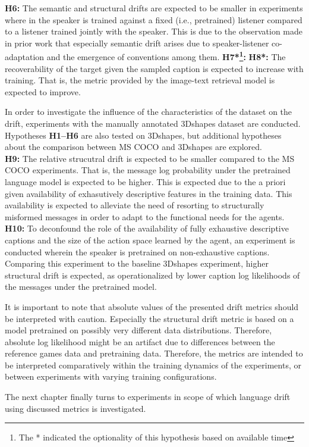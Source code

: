 \textbf{H6:}  The semantic and structural drifts are expected to be smaller in experiments where in the speaker is trained against a fixed (i.e., pretrained) listener compared to a listener trained jointly with the speaker. This is due to the observation made in prior work that especially semantic drift arises due to speaker-listener co-adaptation and the emergence of conventions among them. \newline
\textbf{H7*\footnote{The * indicated the optionality of this hypothesis based on available time}:}  \newline
\textbf{H8*:} The recoverability of the target given the sampled caption is expected to increase with training. That is, the metric provided by the image-text retrieval model is expected to improve.  \newline

In order to investigate the influence of the characteristics of the dataset on the drift, experiments with the manually annotated 3Dshapes dataset are conducted. Hypotheses \textbf{H1--H6} are also tested on 3Dshapes, but additional hypotheses about the comparison between MS COCO and 3Dshapes are explored. \\
\newline
\textbf{H9:} The relative strucutral drift is expected to be smaller compared to the MS COCO experiments. That is, the message log probability under the pretrained language model is expected to be higher. This is expected due to the a priori given availability of exhasutively descriptive features in the training data. This availability is expected to alleviate the need of resorting to structurally misformed messages in order to adapt to the functional needs for the agents. \newline
\textbf{H10:} To deconfound the role of the availability of fully exhaustive descriptive captions and the size of the action space learned by the agent, an experiment is conducted wherein the speaker is pretrained on non-exhaustive captions. Comparing this experiment to the baseline 3Dshapes experiment, higher structural drift is expected, as operationalized by lower caption log likelihoods of the messages under the pretrained model.

It is important to note that absolute values of the presented drift metrics should be interpreted with caution. Especially the structural drift metric is based on a model pretrained on possibly very different data distributions. Therefore, absolute log likelihood might be an artifact due to differences between the reference games data and pretraining data. Therefore, the metrics are intended to be interpreted comparatively within the training dynamics of the experiments, or between experiments with varying training configurations.

The next chapter finally turns to experiments in scope of which language drift using discussed metrics is investigated. 
